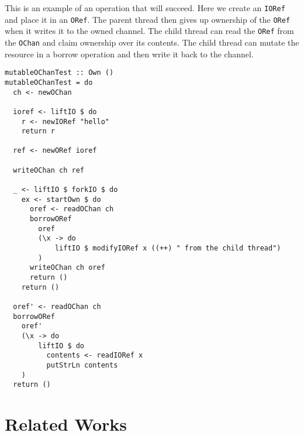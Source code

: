 \documentclass[onehalf,11pt]{beavtex}
\begin{document}
This is an example of an operation that will succeed. Here we create an
\texttt{IORef} and place it in an \texttt{ORef}. The parent thread
then gives up ownership of the \texttt{ORef} when it writes it to the
owned channel. The child thread can read the \texttt{ORef} from the
\texttt{OChan} and claim ownership over its contents. The child thread
can mutate the resource in a borrow operation and then write it back to
the channel. 

\begin{verbatim}
mutableOChanTest :: Own ()
mutableOChanTest = do
  ch <- newOChan

  ioref <- liftIO $ do
    r <- newIORef "hello"
    return r

  ref <- newORef ioref

  writeOChan ch ref

  _ <- liftIO $ forkIO $ do
    ex <- startOwn $ do
      oref <- readOChan ch
      borrowORef
        oref
        (\x -> do
            liftIO $ modifyIORef x ((++) " from the child thread")
        )
      writeOChan ch oref
      return ()
    return ()

  oref' <- readOChan ch
  borrowORef
    oref'
    (\x -> do
        liftIO $ do
          contents <- readIORef x
          putStrLn contents
    )
  return ()
\end{verbatim}







\chapter{Related Works}
\end{document}
